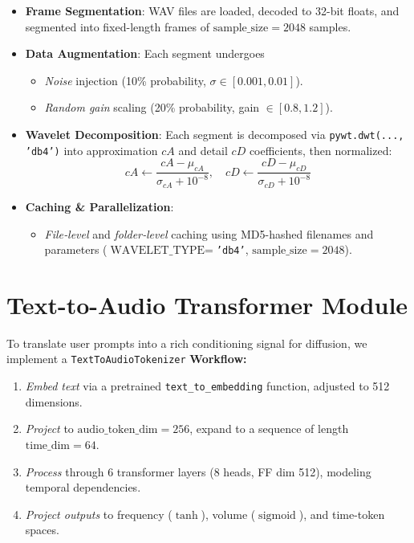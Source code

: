 \documentclass[12pt]{report}
\begin{document}
\begin{itemize}
  \item \textbf{Frame Segmentation}: WAV files are loaded, decoded to 32-bit floats, and segmented into fixed-length frames of \(\text{sample\_size}=2048\) samples.
  \item \textbf{Data Augmentation}: Each segment undergoes
    \begin{itemize}
      \item \emph{Noise} injection (10\% probability, $\sigma\in[0.001,0.01]$).
      \item \emph{Random gain} scaling (20\% probability, gain $\in[0.8,1.2]$).
    \end{itemize}
  \item \textbf{Wavelet Decomposition}: Each segment is decomposed via \texttt{pywt.dwt(..., 'db4')} into approximation \(cA\) and detail \(cD\) coefficients, then normalized:
    \[
      cA \leftarrow \frac{cA - \mu_{cA}}{\sigma_{cA} + 10^{-8}}, \quad
      cD \leftarrow \frac{cD - \mu_{cD}}{\sigma_{cD} + 10^{-8}}
    \]
  \item \textbf{Caching \& Parallelization}:  
    \begin{itemize}
      \item \emph{File‐level} and \emph{folder‐level} caching using MD5-hashed filenames and parameters (\(\text{WAVELET\_TYPE}=\)\texttt{'db4'}, \(\text{sample\_size}=2048\)).
    \end{itemize}
\end{itemize}

\section{Text-to-Audio Transformer Module}

To translate user prompts into a rich conditioning signal for diffusion, we implement a \texttt{TextToAudioTokenizer}
\noindent\textbf{Workflow:}
\begin{enumerate}
  \item \emph{Embed text} via a pretrained \texttt{text\_to\_embedding} function, adjusted to 512 dimensions.
  \item \emph{Project} to \(\text{audio\_token\_dim}=256\), expand to a sequence of length \(\text{time\_dim}=64\).
  \item \emph{Process} through 6 transformer layers (8 heads, FF dim 512), modeling temporal dependencies.
  \item \emph{Project outputs} to frequency (\(\tanh\)), volume (\(\operatorname{sigmoid}\)), and time-token spaces.
\end{enumerate}
\end{document}
